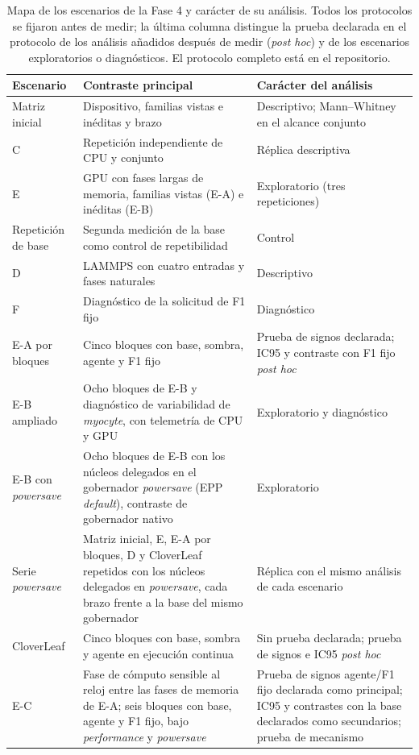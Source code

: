 \begin{table}[h!]
\centering
\caption[Mapa de los escenarios de la Fase 4]
{Mapa de los escenarios de la Fase 4 y carácter de su análisis. Todos los protocolos se fijaron antes de medir; la última columna distingue la prueba declarada en el protocolo de los análisis añadidos después de medir (\textit{post hoc}) y de los escenarios exploratorios o diagnósticos. El protocolo completo está en el repositorio.}
\label{tab:fase4-mapa}
\footnotesize
\setlength{\tabcolsep}{3pt}
\begin{tabular}{@{}>{\raggedright\arraybackslash}p{2.6cm}
                    >{\raggedright\arraybackslash}p{6.6cm}
                    >{\raggedright\arraybackslash}p{4.4cm}@{}}
\toprule
\textbf{Escenario} & \textbf{Contraste principal} & \textbf{Carácter del análisis} \\
\midrule
Matriz inicial & Dispositivo, familias vistas e inéditas y brazo & Descriptivo; Mann--Whitney en el alcance conjunto \\
C & Repetición independiente de CPU y conjunto & Réplica descriptiva \\
E & GPU con fases largas de memoria, familias vistas (E-A) e inéditas (E-B) & Exploratorio (tres repeticiones) \\
Repetición de base & Segunda medición de la base como control de repetibilidad & Control \\
D & LAMMPS con cuatro entradas y fases naturales & Descriptivo \\
F & Diagnóstico de la solicitud de F1 fijo & Diagnóstico \\
E-A por bloques & Cinco bloques con base, sombra, agente y F1 fijo & Prueba de signos declarada; IC95 y contraste con F1 fijo \textit{post hoc} \\
E-B ampliado & Ocho bloques de E-B y diagnóstico de variabilidad de \textit{myocyte}, con telemetría de CPU y GPU & Exploratorio y diagnóstico \\
E-B con \textit{powersave} & Ocho bloques de E-B con los núcleos delegados en el gobernador \textit{powersave} (EPP \textit{default}), contraste de gobernador nativo & Exploratorio \\
Serie \textit{powersave} & Matriz inicial, E, E-A por bloques, D y CloverLeaf repetidos con los núcleos delegados en \textit{powersave}, cada brazo frente a la base del mismo gobernador & Réplica con el mismo análisis de cada escenario \\
CloverLeaf & Cinco bloques con base, sombra y agente en ejecución continua & Sin prueba declarada; prueba de signos e IC95 \textit{post hoc} \\
E-C & Fase de cómputo sensible al reloj entre las fases de memoria de E-A; seis bloques con base, agente y F1 fijo, bajo \textit{performance} y \textit{powersave} & Prueba de signos agente/F1 fijo declarada como principal; IC95 y contrastes con la base declarados como secundarios; prueba de mecanismo \\
\bottomrule
\end{tabular}
\end{table}

